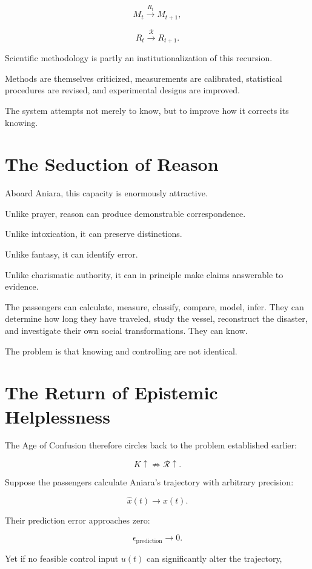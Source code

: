 \documentclass[11pt,oneside]{book}
\theoremstyle{definition}
\theoremstyle{remark}
\newcommand{\R}{\mathcal{R}}
\begin{document}
\[
M_t
\xrightarrow{R_t}
M_{t+1},
\]

\[
R_t
\xrightarrow{\mathcal R}
R_{t+1}.
\]

Scientific methodology is partly an institutionalization of this recursion.

Methods are themselves criticized, measurements are calibrated, statistical procedures are revised, and experimental designs are improved.

The system attempts not merely to know, but to improve how it corrects its knowing.

\section{The Seduction of Reason}

Aboard Aniara, this capacity is enormously attractive.

Unlike prayer, reason can produce demonstrable correspondence.

Unlike intoxication, it can preserve distinctions.

Unlike fantasy, it can identify error.

Unlike charismatic authority, it can in principle make claims answerable to evidence.

The passengers can calculate, measure, classify, compare, model, infer. They can determine how long they have traveled, study the vessel, reconstruct the disaster, and investigate their own social transformations. They can know.

The problem is that knowing and controlling are not identical.

\section{The Return of Epistemic Helplessness}

The Age of Confusion therefore circles back to the problem established earlier:

\[
K\uparrow
\not\Rightarrow
\R\uparrow.
\]

Suppose the passengers calculate Aniara's trajectory with arbitrary precision:

\[
\hat{x}(t)
\rightarrow
x(t).
\]

Their prediction error approaches zero:

\[
\epsilon_{\mathrm{prediction}}
\rightarrow0.
\]

Yet if no feasible control input \(u(t)\) can significantly alter the trajectory,
\end{document}
